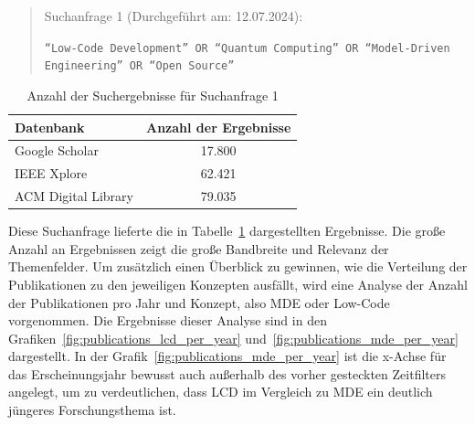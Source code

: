 \begin{quote}
    Suchanfrage 1 (Durchgeführt am: 12.07.2024):

    \texttt{``Low-Code Development'' OR ``Quantum Computing'' OR ``Model-Driven Engineering'' OR ``Open Source''}

\end{quote}

\begin{table}[h!]
    \centering
    \caption{Anzahl der Suchergebnisse für Suchanfrage 1}
    \begin{tabular}{|l|c|}
        \hline
        \textbf{Datenbank} & \textbf{Anzahl der Ergebnisse} \\ \hline
        Google Scholar & 17.800 \\ \hline
        IEEE Xplore & 62.421 \\ \hline
        ACM Digital Library & 79.035 \\ \hline
    \end{tabular}
\label{tab:search_1_results}
\end{table}
    
Diese Suchanfrage lieferte die in Tabelle~\ref{tab:search_1_results} dargestellten Ergebnisse. Die große Anzahl an Ergebnissen 
zeigt die große Bandbreite und Relevanz der Themenfelder. Um zusätzlich einen Überblick zu gewinnen, 
wie die Verteilung der Publikationen zu den jeweiligen Konzepten ausfällt, 
wird eine Analyse der Anzahl der Publikationen pro Jahr und Konzept, also MDE oder Low-Code vorgenommen. 
Die Ergebnisse dieser Analyse sind in den Grafiken~\ref{fig:publications_lcd_per_year} und~\ref{fig:publications_mde_per_year} dargestellt. 
In der Grafik~\ref{fig:publications_mde_per_year} ist die x-Achse für das Erscheinungsjahr bewusst auch außerhalb des vorher gesteckten Zeitfilters 
angelegt, um zu verdeutlichen, dass LCD im Vergleich zu MDE ein deutlich jüngeres Forschungsthema ist.


